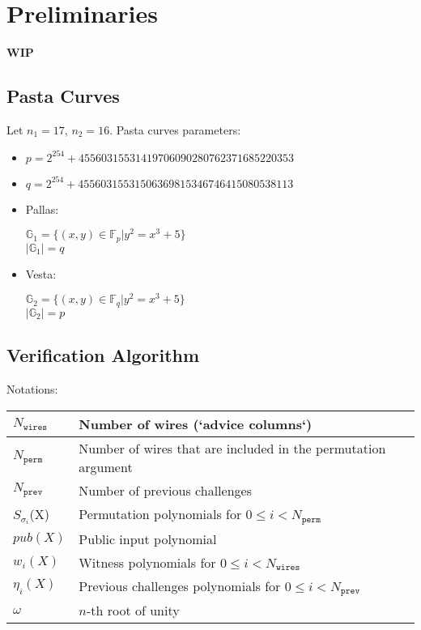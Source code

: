 \section{Preliminaries}
\label{section:preliminaries}
\textbf{WIP}
\subsection{Pasta Curves}

Let $n_1 = 17$, $n_2 = 16$.
Pasta curves parameters:
\begin{itemize}
	\item $p = 2^254 + 45560315531419706090280762371685220353$
	\item $q = 2^254 + 45560315531506369815346746415080538113$
	\item Pallas:
		\begin{center}
			$\mathbb{G}_1 = \{ (x, y) \in \mathbb{F}_p | y^2 = x^3 + 5 \}$ \\
			$|\mathbb{G}_1| = q$
		\end{center}
	\item Vesta:
		\begin{center}
			$\mathbb{G}_2 = \{ (x, y) \in \mathbb{F}_q | y^2 = x^3 + 5 \}$ \\
			$|\mathbb{G}_2| = p$
		\end{center}
\end{itemize}

\subsection{Verification Algorithm}

Notations:

\begin{center}
\begin{table}[H]
\begin{tabular}{| l | l |}
 	\hline
	$N_{\texttt{wires}}$ & Number of wires (`advice columns`) \\
	\hline
	$N_{\texttt{perm}}$ & Number of wires that are included in the permutation argument \\
	\hline
	$N_{\texttt{prev}}$ & Number of previous challenges \\
	\hline
	$S_{\sigma_i}$(X) & Permutation polynomials for $0 \leq i < N_{\texttt{perm}}$ \\
	\hline
	$pub(X)$ & Public input polynomial \\
	\hline
	$w_i(X)$ & Witness polynomials for $0 \leq i < N_{\texttt{wires}}$\\
	\hline
	$\eta_i(X)$ & Previous challenges polynomials for $0 \leq i < N_{\texttt{prev}}$\\
	\hline
	$\omega$ & $n$-th root of unity \\
	\hline
\end{tabular}
\end{table}
\end{center}

